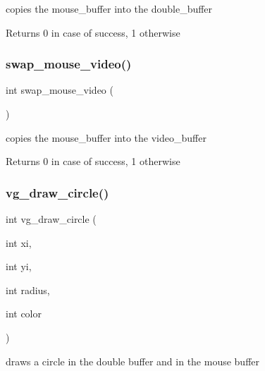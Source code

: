 copies the mouse\+\_\+buffer into the double\+\_\+buffer 

\begin{DoxyReturn}{Returns}
0 in case of success, 1 otherwise 
\end{DoxyReturn}
\hypertarget{group__video__gr_ga8761e145d6f2249e0a4177ed7ff24299}{}\label{group__video__gr_ga8761e145d6f2249e0a4177ed7ff24299} 
\subsubsection{\texorpdfstring{swap\+\_\+mouse\+\_\+video()}{swap\_mouse\_video()}}
{\footnotesize\ttfamily int swap\+\_\+mouse\+\_\+video (\begin{DoxyParamCaption}{ }\end{DoxyParamCaption})}



copies the mouse\+\_\+buffer into the video\+\_\+buffer 

\begin{DoxyReturn}{Returns}
0 in case of success, 1 otherwise 
\end{DoxyReturn}
\hypertarget{group__video__gr_ga0410a09b926582249fb7c0a795c9d4fe}{}\label{group__video__gr_ga0410a09b926582249fb7c0a795c9d4fe} 
\subsubsection{\texorpdfstring{vg\+\_\+draw\+\_\+circle()}{vg\_draw\_circle()}}
{\footnotesize\ttfamily int vg\+\_\+draw\+\_\+circle (\begin{DoxyParamCaption}\item[{int}]{xi,  }\item[{int}]{yi,  }\item[{int}]{radius,  }\item[{int}]{color }\end{DoxyParamCaption})}



draws a circle in the double buffer and in the mouse buffer 


